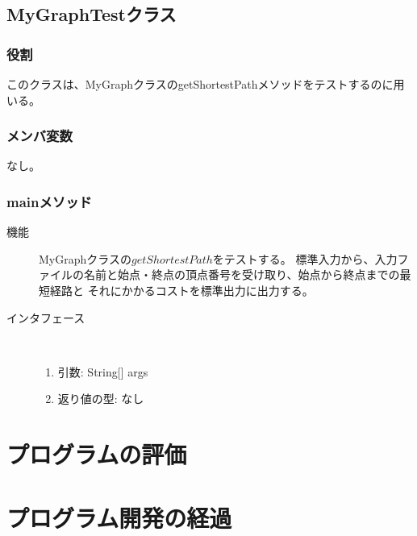 \documentclass[a4j]{jarticle}
\begin{document}
\subsection{MyGraphTestクラス}

\subsubsection{役割}
このクラスは、MyGraphクラスのgetShortestPathメソッドをテストするのに用いる。

\subsubsection{メンバ変数}
なし。

\subsubsection{mainメソッド}

\begin{description}
\item[機能]
MyGraphクラスの\(getShortestPath\)をテストする。
標準入力から、入力ファイルの名前と始点・終点の頂点番号を受け取り、始点から終点までの最短経路と
それにかかるコストを標準出力に出力する。


\item[インタフェース]\ \vspace{0mm}
\begin{enumerate}
  \item 引数: String[] args
  \item 返り値の型: なし
\end{enumerate}
\end{description}


\section{プログラムの評価}



\section{プログラム開発の経過}
\end{document}
